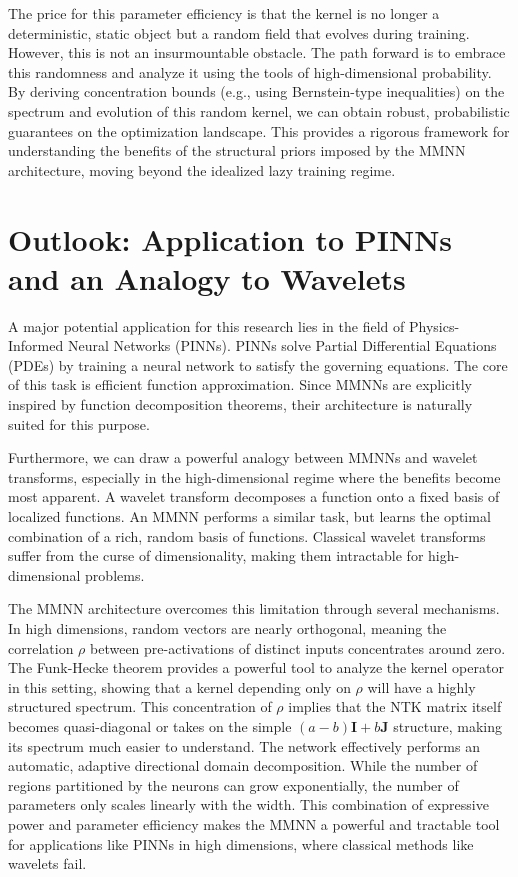 \documentclass[a4paper]{article}
\begin{document}
The price for this parameter efficiency is that the kernel is no longer a deterministic, static object but a random field that evolves during training. However, this is not an insurmountable obstacle. The path forward is to embrace this randomness and analyze it using the tools of high-dimensional probability. By deriving concentration bounds (e.g., using Bernstein-type inequalities) on the spectrum and evolution of this random kernel, we can obtain robust, probabilistic guarantees on the optimization landscape. This provides a rigorous framework for understanding the benefits of the structural priors imposed by the MMNN architecture, moving beyond the idealized lazy training regime.

\section{Outlook: Application to PINNs and an Analogy to Wavelets}
A major potential application for this research lies in the field of Physics-Informed Neural Networks (PINNs). PINNs solve Partial Differential Equations (PDEs) by training a neural network to satisfy the governing equations. The core of this task is efficient function approximation. Since MMNNs are explicitly inspired by function decomposition theorems, their architecture is naturally suited for this purpose.

Furthermore, we can draw a powerful analogy between MMNNs and wavelet transforms, especially in the high-dimensional regime where the benefits become most apparent. A wavelet transform decomposes a function onto a fixed basis of localized functions. An MMNN performs a similar task, but learns the optimal combination of a rich, random basis of functions. Classical wavelet transforms suffer from the curse of dimensionality, making them intractable for high-dimensional problems.

The MMNN architecture overcomes this limitation through several mechanisms. In high dimensions, random vectors are nearly orthogonal, meaning the correlation $\rho$ between pre-activations of distinct inputs concentrates around zero. The Funk-Hecke theorem provides a powerful tool to analyze the kernel operator in this setting, showing that a kernel depending only on $\rho$ will have a highly structured spectrum. This concentration of $\rho$ implies that the NTK matrix itself becomes quasi-diagonal or takes on the simple $(a-b)\mathbf{I} + b\mathbf{J}$ structure, making its spectrum much easier to understand. The network effectively performs an automatic, adaptive directional domain decomposition. While the number of regions partitioned by the neurons can grow exponentially, the number of parameters only scales linearly with the width. This combination of expressive power and parameter efficiency makes the MMNN a powerful and tractable tool for applications like PINNs in high dimensions, where classical methods like wavelets fail.
\end{document}
